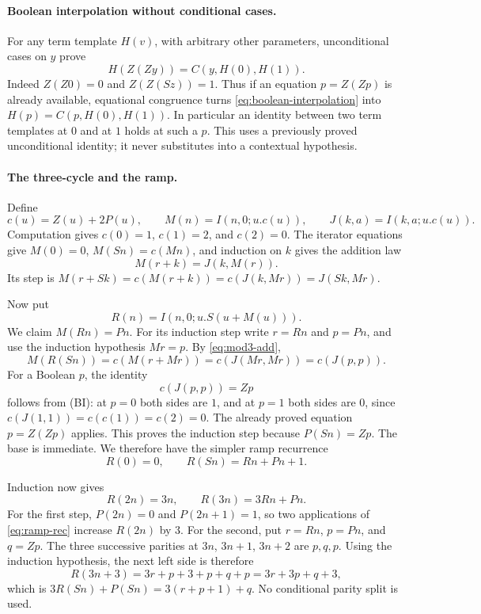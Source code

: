 \documentclass[11pt]{article}
\begin{document}
\paragraph{Boolean interpolation without conditional cases.}
For any term template $H(v)$, with arbitrary other parameters, unconditional
cases on $y$ prove
\begin{equation}
 H(Z(Zy))=C(y,H(0),H(1)).
 \tag{BI}\label{eq:boolean-interpolation}
\end{equation}
Indeed $Z(Z0)=0$ and $Z(Z(Sz))=1$. Thus if an equation $p=Z(Zp)$ is
already available, equational congruence turns \eqref{eq:boolean-interpolation}
into $H(p)=C(p,H(0),H(1))$. In particular an identity between two term
templates at $0$ and at $1$ holds at such a $p$. This uses a previously proved
unconditional identity; it never substitutes into a contextual hypothesis.

\paragraph{The three-cycle and the ramp.}
Define
\[
 c(u)=Z(u)+2P(u),\qquad M(n)=I(n,0;u.c(u)),\qquad
 J(k,a)=I(k,a;u.c(u)).
\]
Computation gives $c(0)=1$, $c(1)=2$, and $c(2)=0$.
The iterator equations give $M(0)=0$, $M(Sn)=c(Mn)$, and induction on $k$
gives the addition law
\begin{equation}
 M(r+k)=J(k,M(r)).\tag{M+}\label{eq:mod3-add}
\end{equation}
Its step is $M(r+Sk)=c(M(r+k))=c(J(k,Mr))=J(Sk,Mr)$.

Now put
\[
 R(n)=I(n,0;u.S(u+M(u))).
\]
We claim $M(Rn)=Pn$. For its induction step write $r=Rn$ and $p=Pn$,
and use the induction hypothesis $Mr=p$. By \eqref{eq:mod3-add},
\[
 M(R(Sn))=c(M(r+Mr))=c(J(Mr,Mr))=c(J(p,p)).
\]
For a Boolean $p$, the identity
\[
 c(J(p,p))=Zp
\]
follows from (BI): at $p=0$ both sides are $1$, and at $p=1$ both sides
are $0$, since $c(J(1,1))=c(c(1))=c(2)=0$.
The already proved equation $p=Z(Zp)$ applies. This proves the induction
step because $P(Sn)=Zp$. The base is immediate.
We therefore have the simpler ramp recurrence
\begin{equation}
 R(0)=0,\qquad R(Sn)=Rn+Pn+1.\tag{R}\label{eq:ramp-rec}
\end{equation}

Induction now gives
\begin{equation}
 R(2n)=3n,\qquad R(3n)=3Rn+Pn.\tag{R23}\label{eq:ramp-multiples}
\end{equation}
For the first step, $P(2n)=0$ and $P(2n+1)=1$, so two applications of
\eqref{eq:ramp-rec} increase $R(2n)$ by $3$.
For the second, put $r=Rn$, $p=Pn$, and $q=Zp$.
The three successive parities at $3n$, $3n+1$, $3n+2$ are $p,q,p$.
Using the induction hypothesis, the next left side is therefore
\[
 R(3n+3)=3r+p+3+p+q+p=3r+3p+q+3,
\]
which is $3R(Sn)+P(Sn)=3(r+p+1)+q$. No conditional parity split is used.
\end{document}
